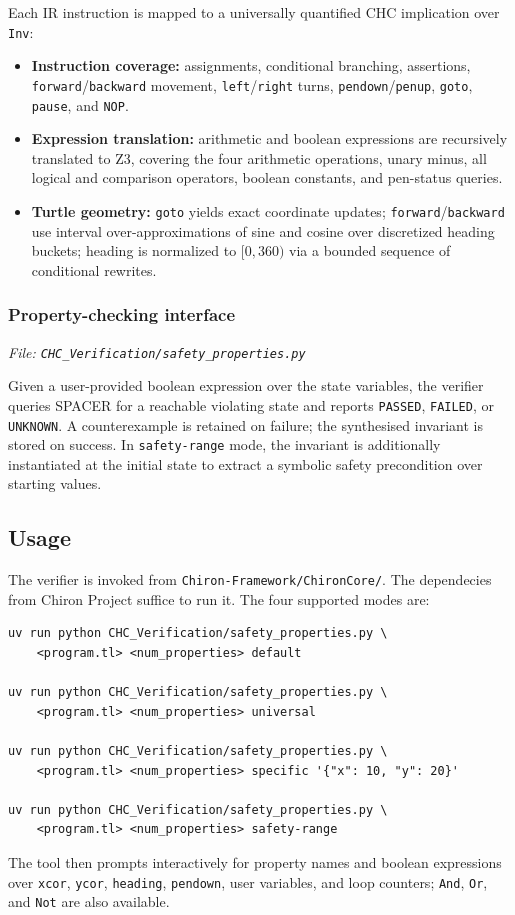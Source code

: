 Each IR instruction is mapped to a universally quantified CHC implication over \texttt{Inv}:
\begin{itemize}[leftmargin=1.5em]
    \item \textbf{Instruction coverage:} assignments, conditional branching, assertions, \texttt{forward}/\texttt{backward} movement, \texttt{left}/\texttt{right} turns, \texttt{pendown}/\texttt{penup}, \texttt{goto}, \texttt{pause}, and \texttt{NOP}.
    \item \textbf{Expression translation:} arithmetic and boolean expressions are recursively translated to Z3, covering the four arithmetic operations, unary minus, all logical and comparison operators, boolean constants, and pen-status queries.
    \item \textbf{Turtle geometry:} \texttt{goto} yields exact coordinate updates; \texttt{forward}/\texttt{backward} use interval over-approximations of sine and cosine over discretized heading buckets; heading is normalized to $[0, 360)$ via a bounded sequence of conditional rewrites.
\end{itemize}

\subsubsection*{Property-checking interface}
\noindent\textit{\small File: \texttt{CHC\_Verification/safety\_properties.py}}

Given a user-provided boolean expression over the state variables, the verifier queries SPACER for a reachable violating state and reports \texttt{PASSED}, \texttt{FAILED}, or \texttt{UNKNOWN}. A counterexample is retained on failure; the synthesised invariant is stored on success. In \texttt{safety-range} mode, the invariant is additionally instantiated at the initial state to extract a symbolic safety precondition over starting values.

\subsection*{Usage}

The verifier is invoked from \texttt{Chiron-Framework/ChironCore/}. The dependecies from Chiron Project suffice to run it. The four supported modes are:

\begin{verbatim}
uv run python CHC_Verification/safety_properties.py \
    <program.tl> <num_properties> default

uv run python CHC_Verification/safety_properties.py \
    <program.tl> <num_properties> universal

uv run python CHC_Verification/safety_properties.py \
    <program.tl> <num_properties> specific '{"x": 10, "y": 20}'

uv run python CHC_Verification/safety_properties.py \
    <program.tl> <num_properties> safety-range
\end{verbatim}

The tool then prompts interactively for property names and boolean expressions over \texttt{xcor}, \texttt{ycor}, \texttt{heading}, \texttt{pendown}, user variables, and loop counters; \texttt{And}, \texttt{Or}, and \texttt{Not} are also available.
